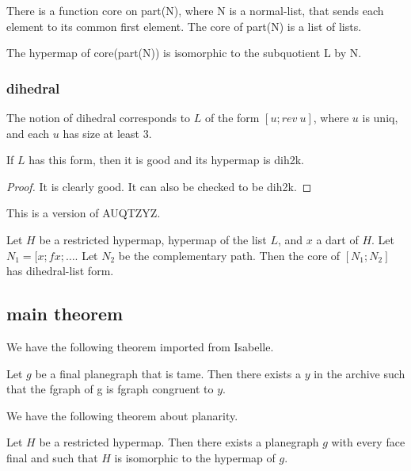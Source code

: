 There is a function core on part(N), where N is a normal-list, that sends each element to its common first element.
The core of part(N) is a list of lists.

\begin{lemma}\guid{}  The hypermap of core(part(N)) is isomorphic to the subquotient L by N. 
\end{lemma}

\subsubsection{dihedral}

The notion of dihedral corresponds to $L$ of the form $[u;rev~u]$, where $u$ is uniq, and each $u$ has size at least $3$.

\begin{lemma}\guid{} If $L$ has this form, then it is good and its hypermap is dih2k.
\end{lemma}

\begin{proof} It is clearly good. It can also be checked to be dih2k.
\end{proof}



This is a version of AUQTZYZ.

\begin{lemma}  Let $H$ be a restricted hypermap, hypermap of the list $L$,
and $x$ a dart of $H$.  Let $N_1 = [x;f x;\ldots$. Let $N_2$ be the complementary path.
Then the core of $[N_1;N_2]$ has dihedral-list form.
\end{lemma}


\subsection{main theorem}

We have the following theorem imported from Isabelle.

\begin{theorem}  Let $g$ be a final
planegraph that is tame.  Then there exists a $y$ in the archive such
that the fgraph of g is fgraph congruent to $y$.
\end{theorem}

We have the following theorem about planarity.

\begin{theorem} Let $H$ be a restricted hypermap.  Then
  there exists a planegraph $g$ with every
  face final and such that $H$ is isomorphic to the hypermap of $g$.
\end{theorem}

